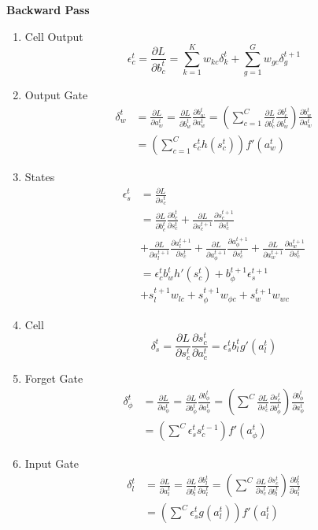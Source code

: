  {\bf Backward Pass}
 \begin{enumerate}
 \item Cell Output\\
	 $$\epsilon_c^t = \frac{\partial L}{\partial b_c^t} = \sum_{k=1}^K w_{kc} \delta_k^t
		 + \sum_{g=1}^G w_{gc} \delta_g^{t+1}$$
 \item Output Gate\\
	 \begin{align*}
		 \delta_w^t &= \frac{\partial L}{\partial a_w^t} = \frac{\partial L}{\partial b_w^t}\frac{\partial b_w^t}{\partial a_w^t}
	 = (\sum_{c=1}^C \frac{\partial L}{\partial b_c^t}\frac{\partial b_c^t}{\partial b_w^t})
		 \frac{\partial b_w^t}{\partial a_w^t}\\
		 &= (\sum_{c=1}^C \epsilon_c^t h(s_c^t)) f'(a_w^t)
	 \end{align*}
 \item States\\
  \begin{align*}
	  \epsilon_s^t &= \frac{\partial L}{\partial s_c^t}\\
	  &= \frac{\partial L}{\partial b_c^t} \frac{\partial b_c^t}{\partial s_c^t} +
		 \frac{\partial L}{\partial s_c^{t+1}} \frac{\partial s_c^{t+1}}{\partial s_c^t} \\
	  &+ \frac{\partial L}{\partial a_l^{t+1}} \frac{\partial a_l^{t+1}}{\partial s_c^t} +
	     \frac{\partial L}{\partial a_\phi^{t+1}} \frac{\partial a_\phi^{t+1}}{\partial s_c^t} +
	     \frac{\partial L}{\partial a_w^{t+1}} \frac{\partial a_w^{t+1}}{\partial s_c^t} \\
	  &= \epsilon_c^t b_w^t h'(s_c^t) + b_\phi^{t+1} \epsilon_s^{t+1} \\
	  &+ s_l^{t+1} w_{lc} + s_\phi^{t+1} w_{\phi c} + s_w^{t+1} w_{wc}
  \end{align*}
 \item Cell\\
	 $$\delta_s^t = \frac{\partial L}{\partial s_c^t} \frac{\partial s_c^t}{\partial a_c^t}
		 = \epsilon_s^t b_l^t g'(a_l^t)$$
 \item Forget Gate\\
	 \begin{align*}
		 \delta_\phi^t &= \frac{\partial L}{\partial a_\phi^t}
		 = \frac{\partial L}{\partial b_\phi^t} \frac{\partial b_\phi^t}{\partial a_\phi^t}
		 = (\sum^C \frac{\partial L}{\partial s_c^t} \frac{\partial s_c^t}{\partial b_\phi^t})
		   \frac{\partial b_\phi^t}{\partial a_\phi^t}\\
		  &= (\sum^C \epsilon_s^t s_c^{t-1}) f'(a_\phi^t)
	 \end{align*}
 \item Input Gate\\
	 \begin{align*}
		 \delta_l^t &= \frac{\partial L}{\partial a_l^t}
		 = \frac{\partial L}{\partial b_l^t} \frac{\partial b_l^t}{\partial a_l^t}
		 = (\sum^C \frac{\partial L}{\partial s_c^t} \frac{\partial s_c^t}{\partial b_l^t})
		   \frac{\partial b_l^t}{\partial a_l^t}\\
		  &= (\sum^C \epsilon_s^t g(a_l^t)) f'(a_l^t)
	 \end{align*}
 \end{enumerate}

